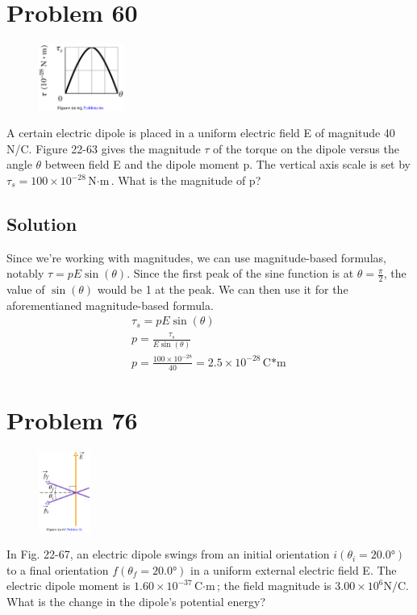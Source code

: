 \documentclass[12pt]{article}
\begin{document}
\section{Problem 60}
\begin{figure}
    \vspace{-30pt}
    \includegraphics[width=0.25\textwidth]{picture_5.png} 
\end{figure}
A certain electric dipole is placed in a uniform electric field E of magnitude 40 N/C. Figure 22-63 gives the magnitude $\tau$ of the torque on the dipole versus the angle $\theta$ between field E and the dipole moment p. The vertical axis scale is set by $\tau_s = 100 \times 10^{-28} \unit{\newton\cdot\meter}$. What is the magnitude of p?

\subsection*{Solution}
Since we're working with magnitudes, we can use magnitude-based formulas, notably \(\tau = pE\sin(\theta)\). 
Since the first peak of the sine function is at $\theta = \frac{\pi}{2}$, the value of $\sin(\theta)$ would be 1 at the peak. 
We can then use it for the aforementianed magnitude-based formula.
\begin{gather*}
    \tau_s  =   pE\sin(\theta)\\
    p   =   \frac{\tau_s}{E\sin(\theta)}\\
    p   =   \frac{100 \times 10^{-28}}{40}
        =   \boxed{2.5 \times 10^{-28} \unit{\coulomb*\meter}}
\end{gather*}

\pagebreak
\section{Problem 76}
\begin{figure}
    \vspace{-30pt}
    \includegraphics[width=0.15\textwidth]{picture_6.png} 
\end{figure}
In Fig. 22-67, an electric dipole swings from an initial orientation $i (\theta_i = 20.0\unit{\degree})$ to a final orientation $f (\theta_f= 20.0\unit{\degree})$ in a uniform external electric field E. The electric dipole moment is $1.60 \times 10^{-37} \unit{\coulomb\cdot\meter}$; the field magnitude is $3.00 \times 10^6 \unit{\newton/\coulomb}$. What is the change in the dipole's potential energy?
\end{document}
